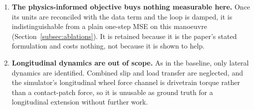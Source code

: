 \begin{enumerate}
to the residual architecture, the loss, the solver, the warm start or the
relaxation individually. Section~\ref{subsec:ablations} does attribute them,
but by offline replay on recorded buffers, so its ordering is not a closed-loop
ordering --- the status, too, of the S4D figure there (\SI{21}{\percent} on
force RMSE at matched settings), which we report as a measured ablation and not
as a reproduction of the closed-loop S4 improvement
of~\cite{visionsysid2026}. The excitation-aware rollout, this paper's central
contribution, is active in \emph{both} arms, so the closed-loop comparison is
not evidence for the identifiability correction; the evidence for that is the
sweep of Section~\ref{subsec:sweep}.
\item \textbf{The physics-informed objective buys nothing measurable here.}
Once its units are reconciled with the data term and the loop is damped, it is
indistinguishable from a plain one-step MSE on this manoeuvre
(Section~\ref{subsec:ablations}). It is retained because it is the paper's
stated formulation and costs nothing, not because it is shown to help.
\item \textbf{Longitudinal dynamics are out of scope.} As in the baseline, only
lateral dynamics are identified. Combined slip and load transfer are neglected,
and the simulator's longitudinal wheel force channel is drivetrain torque
rather than a contact-patch force, so it is unusable as ground truth for a
longitudinal extension without further work.
\end{enumerate}
